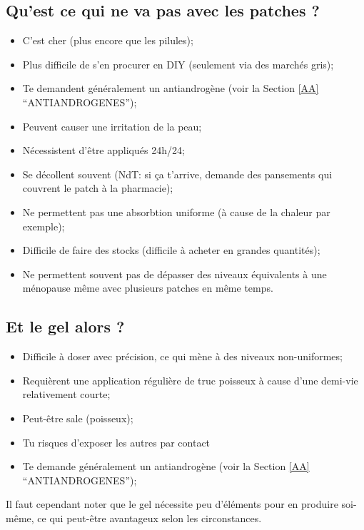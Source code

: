 \documentclass{article}
\begin{document}
\subsection{Qu'est ce qui ne va pas avec les patches ?}

\begin{itemize}
  \item C'est cher (plus encore que les pilules);
  \item Plus difficile de s'en procurer en DIY (seulement via des marchés gris);
  \item Te demandent généralement un antiandrogène (voir la  Section \ref{AA} “ANTIANDROGENES”);
  \item Peuvent causer une irritation de la peau;
  \item Nécessistent d'être appliqués 24h/24;
  \item Se décollent souvent (NdT: si ça t'arrive, demande des pansements qui couvrent le patch à la pharmacie);
  \item Ne permettent pas une absorbtion uniforme (à cause de la chaleur par exemple);
  \item Difficile de faire des stocks (difficile à acheter en grandes quantités);
  \item Ne permettent souvent pas de dépasser des niveaux équivalents à une ménopause même avec plusieurs patches en même temps.
\end{itemize}

\subsection{Et le gel alors ?}

\begin{itemize}
  \item Difficile à doser avec précision, ce qui mène à des niveaux non-uniformes;
  \item Requièrent une application régulière de truc poisseux à cause d'une demi-vie relativement courte;
  \item Peut-être sale (poisseux);
  \item Tu risques d'exposer les autres par contact
  \item Te demande généralement un antiandrogène (voir la  Section \ref{AA} “ANTIANDROGENES”);
\end{itemize}

Il faut cependant noter que le gel nécessite peu d'éléments pour en produire soi-même, ce qui peut-être avantageux selon les circonstances.
\end{document}

